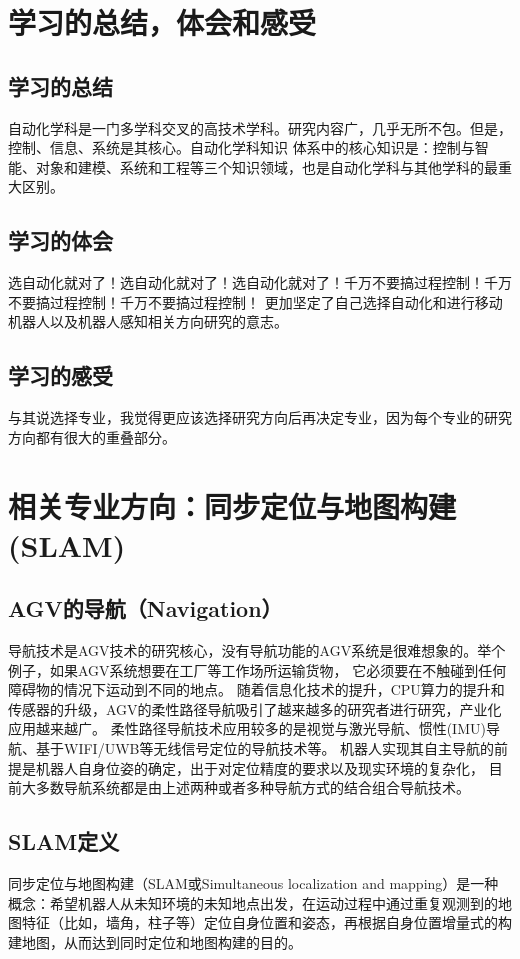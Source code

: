 \documentclass[cs4size,a4paper]{ctexart}
\numberwithin{equation}{section}
\numberwithin{table}{section}
\numberwithin{figure}{section}
\begin{document}
\section{学习的总结，体会和感受}
\subsection{学习的总结}
自动化学科是一门多学科交叉的高技术学科。研究内容广，几乎无所不包。但是，控制、信息、系统是其核心。自动化学科知识
体系中的核心知识是：控制与智能、对象和建模、系统和工程等三个知识领域，也是自动化学科与其他学科的最重大区别。
\subsection{学习的体会}
选自动化就对了！选自动化就对了！选自动化就对了！千万不要搞过程控制！千万不要搞过程控制！千万不要搞过程控制！
更加坚定了自己选择自动化和进行移动机器人以及机器人感知相关方向研究的意志。
\subsection{学习的感受}
与其说选择专业，我觉得更应该选择研究方向后再决定专业，因为每个专业的研究方向都有很大的重叠部分。

\section{相关专业方向：同步定位与地图构建(SLAM)}
\subsection{AGV的导航（Navigation）}
导航技术是AGV技术的研究核心，没有导航功能的AGV系统是很难想象的。举个例子，如果AGV系统想要在工厂等工作场所运输货物，
它必须要在不触碰到任何障碍物的情况下运动到不同的地点。
随着信息化技术的提升，CPU算力的提升和传感器的升级，AGV的柔性路径导航吸引了越来越多的研究者进行研究，产业化应用越来越广。
柔性路径导航技术应用较多的是视觉与激光导航、惯性(IMU)导航\cite{5670227}、基于WIFI/UWB等无线信号定位\cite{4380919}的导航技术等。
机器人实现其自主导航的前提是机器人自身位姿的确定，出于对定位精度的要求以及现实环境的复杂化，
目前大多数导航系统都是由上述两种或者多种导航方式的结合组合导航技术\cite{7916260}。

\subsection{SLAM定义}
同步定位与地图构建（SLAM或Simultaneous localization and mapping）是一种概念：希望机器人从未知环境的未知地点出发，在运动过程中通过重复观测到的地图特征（比如，墙角，柱子等）定位自身位置和姿态，再根据自身位置增量式的构建地图，从而达到同时定位和地图构建的目的。
\end{document}
